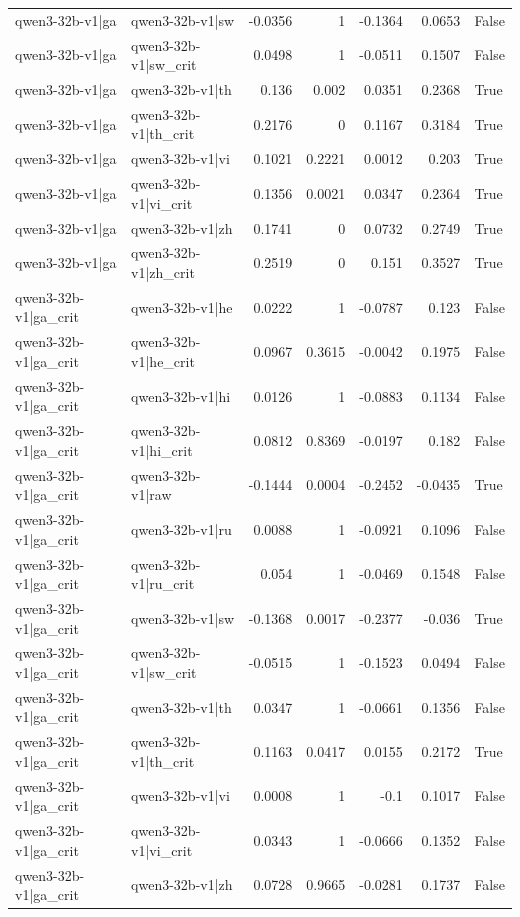 \begin{table}
\begin{tabular}{l l r r r r l}
qwen3-32b-v1|ga & qwen3-32b-v1|sw & -0.0356 & 1 & -0.1364 & 0.0653 & False \\
qwen3-32b-v1|ga & qwen3-32b-v1|sw_crit & 0.0498 & 1 & -0.0511 & 0.1507 & False \\
qwen3-32b-v1|ga & qwen3-32b-v1|th & 0.136 & 0.002 & 0.0351 & 0.2368 & True \\
qwen3-32b-v1|ga & qwen3-32b-v1|th_crit & 0.2176 & 0 & 0.1167 & 0.3184 & True \\
qwen3-32b-v1|ga & qwen3-32b-v1|vi & 0.1021 & 0.2221 & 0.0012 & 0.203 & True \\
qwen3-32b-v1|ga & qwen3-32b-v1|vi_crit & 0.1356 & 0.0021 & 0.0347 & 0.2364 & True \\
qwen3-32b-v1|ga & qwen3-32b-v1|zh & 0.1741 & 0 & 0.0732 & 0.2749 & True \\
qwen3-32b-v1|ga & qwen3-32b-v1|zh_crit & 0.2519 & 0 & 0.151 & 0.3527 & True \\
qwen3-32b-v1|ga_crit & qwen3-32b-v1|he & 0.0222 & 1 & -0.0787 & 0.123 & False \\
qwen3-32b-v1|ga_crit & qwen3-32b-v1|he_crit & 0.0967 & 0.3615 & -0.0042 & 0.1975 & False \\
qwen3-32b-v1|ga_crit & qwen3-32b-v1|hi & 0.0126 & 1 & -0.0883 & 0.1134 & False \\
qwen3-32b-v1|ga_crit & qwen3-32b-v1|hi_crit & 0.0812 & 0.8369 & -0.0197 & 0.182 & False \\
qwen3-32b-v1|ga_crit & qwen3-32b-v1|raw & -0.1444 & 0.0004 & -0.2452 & -0.0435 & True \\
qwen3-32b-v1|ga_crit & qwen3-32b-v1|ru & 0.0088 & 1 & -0.0921 & 0.1096 & False \\
qwen3-32b-v1|ga_crit & qwen3-32b-v1|ru_crit & 0.054 & 1 & -0.0469 & 0.1548 & False \\
qwen3-32b-v1|ga_crit & qwen3-32b-v1|sw & -0.1368 & 0.0017 & -0.2377 & -0.036 & True \\
qwen3-32b-v1|ga_crit & qwen3-32b-v1|sw_crit & -0.0515 & 1 & -0.1523 & 0.0494 & False \\
qwen3-32b-v1|ga_crit & qwen3-32b-v1|th & 0.0347 & 1 & -0.0661 & 0.1356 & False \\
qwen3-32b-v1|ga_crit & qwen3-32b-v1|th_crit & 0.1163 & 0.0417 & 0.0155 & 0.2172 & True \\
qwen3-32b-v1|ga_crit & qwen3-32b-v1|vi & 0.0008 & 1 & -0.1 & 0.1017 & False \\
qwen3-32b-v1|ga_crit & qwen3-32b-v1|vi_crit & 0.0343 & 1 & -0.0666 & 0.1352 & False \\
qwen3-32b-v1|ga_crit & qwen3-32b-v1|zh & 0.0728 & 0.9665 & -0.0281 & 0.1737 & False \\

\end{tabular}
\end{table}
